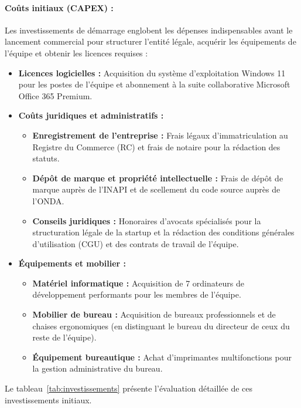 \paragraph{Coûts initiaux (CAPEX) :}
Les investissements de démarrage englobent les dépenses indispensables avant le lancement commercial pour structurer l'entité légale, acquérir les équipements de l'équipe et obtenir les licences requises :
\begin{itemize}[leftmargin=1.5em]
    \item \textbf{Licences logicielles :} Acquisition du système d'exploitation Windows 11 pour les postes de l'équipe et abonnement à la suite collaborative Microsoft Office 365 Premium.
    \item \textbf{Coûts juridiques et administratifs :}
    \begin{itemize}
        \item \textbf{Enregistrement de l'entreprise :} Frais légaux d'immatriculation au Registre du Commerce (RC) et frais de notaire pour la rédaction des statuts.
        \item \textbf{Dépôt de marque et propriété intellectuelle :} Frais de dépôt de marque auprès de l'INAPI et de scellement du code source auprès de l'ONDA.
        \item \textbf{Conseils juridiques :} Honoraires d'avocats spécialisés pour la structuration légale de la startup et la rédaction des conditions générales d'utilisation (CGU) et des contrats de travail de l'équipe.
    \end{itemize}
    \item \textbf{Équipements et mobilier :}
    \begin{itemize}
        \item \textbf{Matériel informatique :} Acquisition de 7 ordinateurs de développement performants pour les membres de l'équipe.
        \item \textbf{Mobilier de bureau :} Acquisition de bureaux professionnels et de chaises ergonomiques (en distinguant le bureau du directeur de ceux du reste de l'équipe).
        \item \textbf{Équipement bureautique :} Achat d'imprimantes multifonctions pour la gestion administrative du bureau.
    \end{itemize}
\end{itemize}

Le tableau~\ref{tab:investissements} présente l'évaluation détaillée de ces investissements initiaux.

